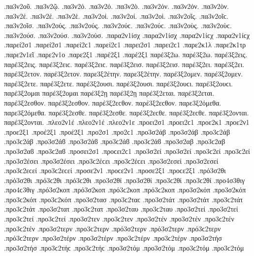 {.πα3ν2οῦ.   %
.πα3ν2ῷ.
.πα3ν2ό. .πα3ν2ό.
.πα3ν2ὸ.
.πα3ν2όν. .πα3ν2όν.
.πα3ν2ὸν.
.πα3ν2έ. .πα3ν2έ.
.πα3ν2ὲ.
.πα3ν2οί. .πα3ν2οί.
.πα3ν2οὶ.
.πα3ν2οῖς. .πα3ν2οῖϲ.
.πα3ν2οῖσ.
.πα3ν2ούς. .πα3ν2ούς. .πα3ν2ούϲ. .πα3ν2ούϲ.
.πα3ν2οὺς. .πα3ν2οὺϲ.
.πα3ν2ούσ. .πα3ν2ούσ.
.πα3ν2οὺσ.
.παρα2ν1ίσχ .παρα2ν1ίσχ .παρα2ν1ίϲχ .παρα2ν1ίϲχ   %
.παρεί2σ1 .παρεί2σ1 .παρεί2ϲ1 .παρεί2ϲ1   %
.παρει2σ1 .παρει2ϲ1
.παρε2κ1λ   %
.παρε2κ1τρ   %
.παρε2ν1εῖ   %
.παρε2ν1ο   %
.παρε2ξ1
.παρέ2ξ1 .παρέ2ξ1
παρέ3ξ2ω. παρέ3ξ2ω.   %
παρέ3ξ2εις. παρέ3ξ2εις. παρέ3ξ2ειϲ. παρέ3ξ2ειϲ.
παρέ3ξ2εισ. παρέ3ξ2εισ.
παρέ3ξ2ει. παρέ3ξ2ει.
παρέ3ξ2ετον. παρέ3ξ2ετον.
παρε3ξ2έτην. παρε3ξ2έτην.
παρέ3ξ2ομεν. παρέ3ξ2ομεν.
παρέ3ξ2ετε. παρέ3ξ2ετε.
παρέ3ξ2ουσι. παρέ3ξ2ουσι. παρέ3ξ2ουϲι. παρέ3ξ2ουϲι.
παρέ3ξ2ομαι παρέ3ξ2ομαι
παρέ3ξ2ῃ παρέ3ξ2ῃ
παρέ3ξ2εται. παρέ3ξ2εται.
παρέ3ξ2εσθον. παρέ3ξ2εσθον. παρέ3ξ2εϲθον. παρέ3ξ2εϲθον.
παρε3ξ2όμεθα. παρε3ξ2όμεθα.
παρέ3ξ2εσθε. παρέ3ξ2εσθε. παρέ3ξ2εϲθε. παρέ3ξ2εϲθε.
παρέ3ξ2ονται. παρέ3ξ2ονται.
.πλεο2ν1έ .πλεο2ν1έ   %
.πλεο2ν1ε
.προει2σ1 .προει2ϲ1   %
.προε2κ1   %
.προε2ν1   %
.προε2ξ1   %
.προέ2ξ1 .προέ2ξ1   %
.προ2σ1 .προ2ϲ1
.προ3σ2άβ .προ3σ2άβ .προ3ϲ2άβ .προ3ϲ2άβ .προ3σ2άϐ .προ3σ2άϐ .προ3ϲ2άϐ .προ3ϲ2άϐ %
.προ3σ2αβ .προ3ϲ2αβ .προ3σ2αϐ .προ3ϲ2αϐ
.προσει2σ1 .προϲει2ϲ1   %
.προ3σ2εί .προ3σ2εί .προ3ϲ2εί .προ3ϲ2εί   %
.προ3σ2έσει .προ3σ2έσει .προ3ϲ2έϲει .προ3ϲ2έϲει
.προ3σ2εσεί .προ3σ2εσεί .προ3ϲ2εϲεί .προ3ϲ2εϲεί
.προσε2ν1 .προϲε2ν1   %
.προσε2ξ1 .προϲε2ξ1   %
.πρό3σ2θι .πρό3σ2θι .πρό3ϲ2θι .πρό3ϲ2θι   %
.προ3σ2θί .προ3σ2θί .προ3ϲ2θί .προ3ϲ2θί
.προ4σ3θιγ .προ4ϲ3θιγ   %
.πρό3σ2κοπ .πρό3σ2κοπ .πρό3ϲ2κοπ .πρό3ϲ2κοπ   %
.προ3σ2κόπ .προ3σ2κόπ .προ3ϲ2κόπ .προ3ϲ2κόπ
.προ3σ2τασ .προ3ϲ2ταϲ   %
.προ3σ2τάτ .προ3σ2τάτ .προ3ϲ2τάτ .προ3ϲ2τάτ   %
.προ3σ2τατ .προ3ϲ2τατ   %
.προ3σ2ταυ .προ3ϲ2ταυ   %
.προ3σ2τεί .προ3σ2τεί .προ3ϲ2τεί .προ3ϲ2τεί   %
.προ3σ2τεν .προ3ϲ2τεν   %
.προ3σ2τέν .προ3σ2τέν .προ3ϲ2τέν .προ3ϲ2τέν   %
.προ3σ2τερν .προ3ϲ2τερν   %
.πρό3σ2τερν .πρό3σ2τερν .πρό3ϲ2τερν .πρό3ϲ2τερν   %
.προ3σ2τέρν .προ3σ2τέρν .προ3ϲ2τέρν .προ3ϲ2τέρν
.προ3σ2τήσ .προ3σ2τήσ .προ3ϲ2τήϲ .προ3ϲ2τήϲ   %
.προ3σ2τόμ .προ3σ2τόμ .προ3ϲ2τόμ .προ3ϲ2τόμ   %
}
